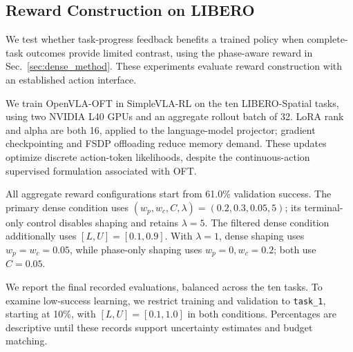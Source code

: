\subsection{Reward Construction on LIBERO}\label{sec:libero_setup}
We test whether task-progress feedback benefits a trained policy when complete-task outcomes provide limited contrast, using the phase-aware reward in Sec.~\ref{sec:dense_method}. These experiments evaluate reward construction with an established action interface.

We train OpenVLA-OFT in SimpleVLA-RL on the ten LIBERO-Spatial tasks, using two NVIDIA L40 GPUs and an aggregate rollout batch of 32. LoRA rank and alpha are both 16, applied to the language-model projector; gradient checkpointing and FSDP offloading reduce memory demand. These updates optimize discrete action-token likelihoods, despite the continuous-action supervised formulation associated with OFT. 

All aggregate reward configurations start from 61.0\% validation success. The primary dense condition uses $(w_p,w_c,C,\lambda)=(0.2,0.3,0.05,5)$; its terminal-only control disables shaping and retains $\lambda=5$. The filtered dense condition additionally uses $[L,U]=[0.1,0.9]$. With $\lambda=1$, dense shaping uses $w_p=w_c=0.05$, while phase-only shaping uses $w_p=0,w_c=0.2$; both use $C=0.05$.

We report the final recorded evaluations, balanced across the ten tasks. To examine low-success learning, we restrict training and validation to \texttt{task\_1}, starting at 10\%, with $[L,U]=[0.1,1.0]$ in both conditions.  Percentages are descriptive until these records support uncertainty estimates and budget matching.
